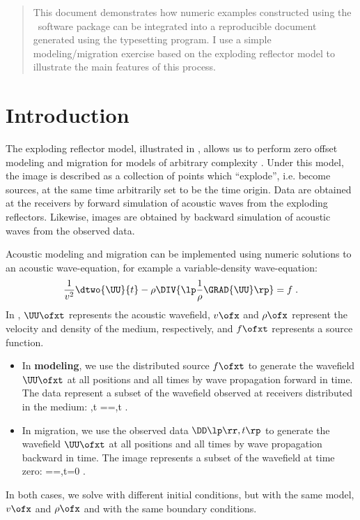 \begin{abstract}
  This document demonstrates how numeric examples constructed using
  the \mg~software package can be integrated into a reproducible
  document generated using the \latex typesetting program. I use a
  simple modeling/migration exercise based on the exploding reflector
  model to illustrate the main features of this process.
\end{abstract}

\section{Introduction}
The exploding reflector model, illustrated in , allows us
to perform zero offset modeling and migration for models of arbitrary
complexity \cite[]{Claerbout.iei.1985}. Under this model, the image is
described as a collection of points which ``explode'', i.e. become
sources, at the same time arbitrarily set to be the time origin. Data
are obtained at the receivers by forward simulation of acoustic waves
from the exploding reflectors. Likewise, images are obtained by
backward simulation of acoustic waves from the observed data.


Acoustic modeling and migration can be implemented using numeric
solutions to an acoustic wave-equation, for example a variable-density
wave-equation:
%
\begin{equation} \label{eqn:AWE}
  \frac{1}{v^2} \dtwo{\UU}{t} - 
  \rho \DIV{\lp \frac{1}{\rho} \GRAD{\UU} \rp} = f \;.
\end{equation}
%
In , $\UU\ofxt$ represents the acoustic wavefield, $v\ofx$
and $\rho\ofx$ represent the velocity and density of the medium,
respectively, and $f\ofxt$ represents a source function.
\begin{itemize}
\item In \textbf{modeling}, we use the distributed source $f\ofxt$ to
  generate the wavefield $\UU\ofxt$ at all positions and all times by
  wave propagation forward in time. The data represent a subset of the
  wavefield observed at receivers distributed in the medium: 
  \beq
  \DD\lp \rr,t \rp=\UU\lp \xx=\rr,t \rp \;.
  \eeq
\item In migration, we use the observed data $\DD\lp \rr,t \rp$ to
  generate the wavefield $\UU\ofxt$ at all positions and all times by
  wave propagation backward in time. The image represents a subset of
  the wavefield at time zero: 
  \beq
  \RR\ofx=\UU\lp \xx=,t=0 \rp \;.
  \eeq
\end{itemize}
In both cases, we solve  with different initial conditions,
but with the same model, $v\ofx$ and $\rho\ofx$ and with the same
boundary conditions.

